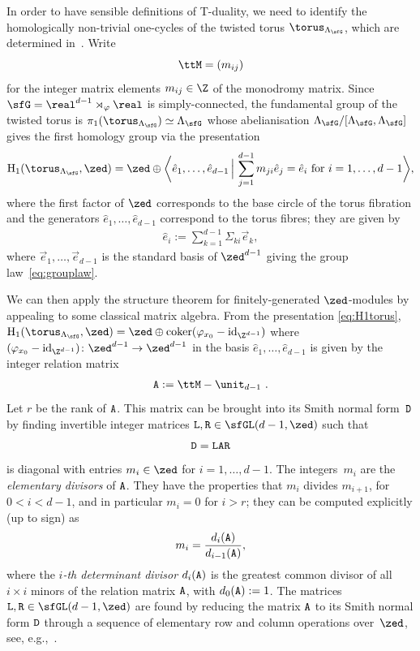 In order to have sensible definitions of
T-duality, we need to identify the
homologically non-trivial one-cycles of the twisted torus
$\torus_{\Lambda_\sfG}$, which are determined
in~\cite[Proposition~4.7]{Bock2009}. Write
\[
\ttM = (m_{ij})
\]
for the
integer matrix elements $m_{ij}\in\Z$ of the monodromy matrix. Since
$\sfG=\real^{d-1}\rtimes_\varphi\real$ is simply-connected, the
fundamental group of the twisted torus is
$\pi_1(\torus_{\Lambda_\sfG})\simeq\Lambda_\sfG$ whose abelianisation
$\Lambda_\sfG/[\Lambda_\sfG,\Lambda_\sfG]$ gives
the first homology group via the presentation
\begin{gather}\label{eq:H1torus}
{\rm H}_1(\torus_{\Lambda_\sfG},\zed) = \zed \oplus \bigg\langle
\hat e_1,\dots,\hat e_{d-1} \, \Big| \, \sum_{j=1}^{d-1} m_{ji} \hat
e_j = \hat e_i
\ \mbox{for} \
i=1,\dots,d-1 \bigg\rangle,
\end{gather}
where the first factor of $\zed$ corresponds to the base circle of the
torus fibration and the generators $\hat e_1,\dots,\hat e_{d-1}$
correspond to the torus fibres; they are given by
\begin{gather}\label{eq:hatei}
\hat e_i:=\sum_{k=1}^{d-1} \Sigma_{ki} \vec e_k,
\end{gather}
where
$\vec e_1,\ldots, \vec e_{d-1}$ is the standard basis of $\zed^{d-1}$ giving the
group law~\eqref{eq:grouplaw}.

We can then apply the structure theorem for finitely-generated
$\zed$-modules by appealing to some classical matrix algebra.
From the presentation \eqref{eq:H1torus}, ${\rm
 H}_1(\torus_{\Lambda_\sfG},\zed) = \zed \oplus {\rm{coker}}(\varphi_{x_0}-{\rm{id}}_{\Z^{d-1}})$
where $(\varphi_{x_0}-{\rm{id}}_{\Z^{d-1}})\colon \zed^{d-1}\to\zed^{d-1}$ in the
basis $\hat e_1,\ldots,\hat e_{d-1}$ is given by the integer relation matrix
\begin{gather}\label{eq:relationmatrix}
{\tt A}:=\ttM-\unit_{d-1}~.
\end{gather}
Let $r$ be the rank of $\tt A$. This matrix can be brought into its Smith normal form~$\tt D$
by finding invertible integer matrices ${\tt L}, {\tt
 R}\in\sfGL(d-1,\zed)$ such that
\[
{\tt D} = {\tt L} {\tt A} {\tt R}
\]
is diagonal with entries $m_i\in\zed$ for
$i=1,\dots,d-1$. The
integers~$m_i$ are the \emph{elementary divisors} of
${\tt A}$. They have the properties that $m_i$ divides
$m_{i+1}$, for $0<i<d-1$, and in particular $m_i=0$ for $i>r$; they can
be computed explicitly (up to sign) as
\[
m_i = \frac{d_i({\tt A})}{d_{i-1}({\tt A})},
\]
where the \emph{$i$-th determinant divisor} $d_i({\tt A})$ is the greatest common
divisor of all $i{\times} i$ minors of the relation matrix ${\tt A}$,
with $d_0({\tt A}):=1$. The matrices ${\tt L}, {\tt
 R}\in\sfGL(d-1,\zed)$ are found by reducing the matrix ${\tt A}$ to
its Smith normal form ${\tt D}$ through a sequence of elementary row
and column operations over~$\zed$, see, e.g.,~\cite{Havas1997}.

